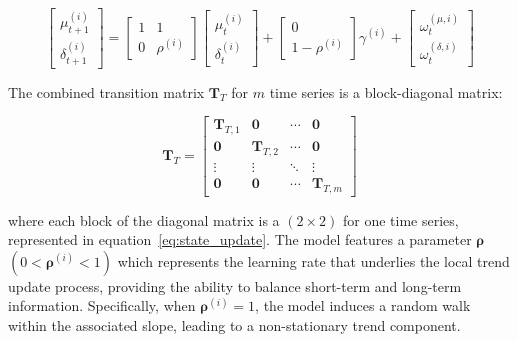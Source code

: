     \begin{equation}
        \left[
            \begin{array}{c}
                \mu_{t+1}^{(i)} \\
                \delta_{t+1}^{(i)}
            \end{array}
        \right] =
        \left[
            \begin{array}{cc}
                1 & 1 \\
                0 & \rho^{(i)}
            \end{array}
        \right]
        \left[
            \begin{array}{c}
                \mu_{t}^{(i)} \\
                \delta_{t}^{(i)}
            \end{array}
        \right] +
        \left[
            \begin{array}{c}
                0 \\
                1 - \rho^{(i)}
            \end{array}
        \right]
        \gamma^{(i)} +
        \left[
            \begin{array}{c}
                \omega_{t}^{(\mu,i)} \\
                \omega_{t}^{(\delta,i)}
            \end{array}
        \right]
        \label{eq:state_update}
    \end{equation}

    The combined transition matrix $\bm{T}_T$ for $m$ time series is a block-diagonal matrix:

    \begin{equation}
        \mathbf{T}_T=
            \left[
                \begin{array}{cccc}
                    \mathbf{T}_{T, 1} & \mathbf{0}        & \cdots & \mathbf{0} \\
                    \mathbf{0}        & \mathbf{T}_{T, 2} & \cdots & \mathbf{0} \\
                    \vdots            & \vdots            & \ddots & \vdots     \\
                    \mathbf{0}        & \mathbf{0}        & \cdots & \mathbf{T}_{T, m}
                \end{array}
            \right]
        \label{eq:state_transition_mv}
    \end{equation}

    where each block of the diagonal matrix is a $(2 \times 2)$ for one time series,
    represented in equation~\ref{eq:state_update}.
    The model features a parameter $\bm{\rho}$ $(0 < \bm{\rho}^{(i)} < 1)$ which represents the learning rate
    that underlies the local trend update process, providing the ability to balance short-term and long-term information.
    Specifically, when $\bm{\rho}^{(i)} = 1$, the model induces a random walk within the associated slope,
    leading to a non-stationary trend component.

